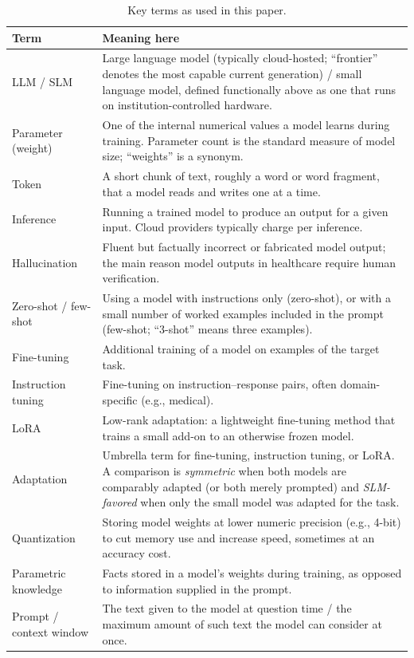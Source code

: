 \documentclass[11pt]{article}
\begin{document}
\begin{table}[p]
\centering
\small
\caption{Key terms as used in this paper.}
\label{tab:glossary}
\begin{tabular}{@{}p{3.4cm}p{11.4cm}@{}}
\toprule
Term & Meaning here \\
\midrule
LLM / SLM & Large language model (typically cloud-hosted; ``frontier'' denotes the most capable current generation) / small language model, defined functionally above as one that runs on institution-controlled hardware. \\
Parameter (weight) & One of the internal numerical values a model learns during training. Parameter count is the standard measure of model size; ``weights'' is a synonym. \\
Token & A short chunk of text, roughly a word or word fragment, that a model reads and writes one at a time. \\
Inference & Running a trained model to produce an output for a given input. Cloud providers typically charge per inference. \\
Hallucination & Fluent but factually incorrect or fabricated model output; the main reason model outputs in healthcare require human verification. \\
Zero-shot / few-shot & Using a model with instructions only (zero-shot), or with a small number of worked examples included in the prompt (few-shot; ``3-shot'' means three examples). \\
Fine-tuning & Additional training of a model on examples of the target task. \\
Instruction tuning & Fine-tuning on instruction--response pairs, often domain-specific (e.g., medical). \\
LoRA & Low-rank adaptation: a lightweight fine-tuning method that trains a small add-on to an otherwise frozen model. \\
Adaptation & Umbrella term for fine-tuning, instruction tuning, or LoRA. A comparison is \emph{symmetric} when both models are comparably adapted (or both merely prompted) and \emph{SLM-favored} when only the small model was adapted for the task. \\
Quantization & Storing model weights at lower numeric precision (e.g., 4-bit) to cut memory use and increase speed, sometimes at an accuracy cost. \\
Parametric knowledge & Facts stored in a model's weights during training, as opposed to information supplied in the prompt. \\
Prompt / context window & The text given to the model at question time / the maximum amount of such text the model can consider at once. \\

\end{tabular}
\end{table}
\end{document}
